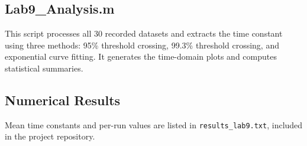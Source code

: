 \documentclass[11pt]{article}
\begin{document}
\subsection{Lab9\_Analysis.m}
This script processes all 30 recorded datasets and extracts the time constant using three methods: 95\% threshold crossing, 99.3\% threshold crossing, and exponential curve fitting. It generates the time-domain plots and computes statistical summaries.

\newpage
\subsection{Numerical Results}
Mean time constants and per-run values are listed in \texttt{results\_lab9.txt}, included in the project repository.

\end{document}
